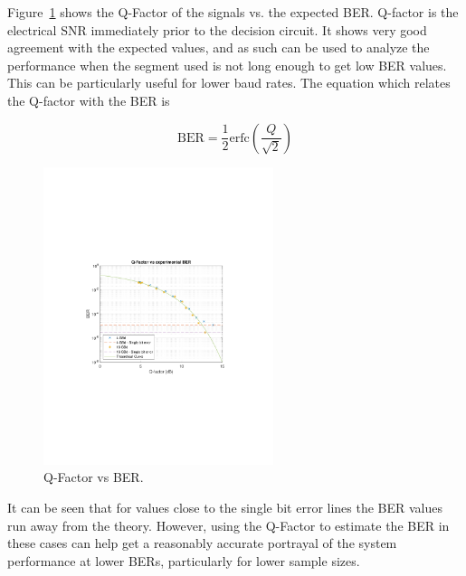 \begin{refsection}
Figure~\ref{fig:expBerOutSnr} shows the Q-Factor of the signals vs. the 
expected BER. Q-factor is the electrical SNR immediately prior to the decision 
circuit. It shows very good agreement with the expected values, and as such 
can be used to analyze the performance 
when the segment used is not long enough to get low BER values. This can be 
particularly useful for lower baud rates. The equation which relates the Q-factor with the BER is~\cite{ituto201}

\begin{equation}
\text{BER} = \frac{1}{2} \text{erfc}\left( \frac{Q}{\sqrt{2}}\right)
\end{equation}

\begin{figure}[H]
	\centering
	\includegraphics[clip, trim=4cm 8cm 4cm 8cm, 
width=0.6\textwidth]{./sdf/m_qam_system/figures/expResults/qFactorVsBER.pdf}
	\caption{Q-Factor vs BER.}
	\label{fig:expBerOutSnr}
\end{figure}

It can be seen that for values close to the single bit error lines the BER values run away from the theory. However, using the Q-Factor to estimate the BER in these cases can help get a reasonably accurate portrayal of the system performance at lower BERs, particularly for lower sample sizes.

%



\end{refsection}
